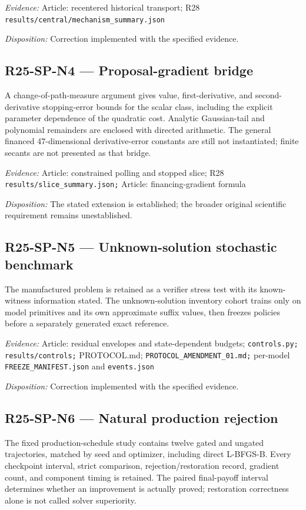 \emph{Evidence:} Article: recentered historical transport; R28 \nolinkurl{results/central/mechanism_summary.json}

\emph{Disposition:} Correction implemented with the specified evidence.
\subsection{R25-SP-N4 --- Proposal-gradient bridge}
A change-of-path-measure argument gives value, first-derivative, and second-derivative stopping-error bounds for the scalar class, including the explicit parameter dependence of the quadratic cost. Analytic Gaussian-tail and polynomial remainders are enclosed with directed arithmetic. The general financed 47-dimensional derivative-error constants are still not instantiated; finite secants are not presented as that bridge.

\emph{Evidence:} Article: constrained polling and stopped slice; R28 \nolinkurl{results/slice_summary.json;} Article: financing-gradient formula

\emph{Disposition:} The stated extension is established; the broader original scientific requirement remains unestablished.
\subsection{R25-SP-N5 --- Unknown-solution stochastic benchmark}
The manufactured problem is retained as a verifier stress test with its known-witness information stated. The unknown-solution inventory cohort trains only on model primitives and its own approximate suffix values, then freezes policies before a separately generated exact reference.

\emph{Evidence:} Article: residual envelopes and state-dependent budgets; \nolinkurl{controls.py;} \nolinkurl{results/controls;} PROTOCOL.md; \nolinkurl{PROTOCOL_AMENDMENT_01.md;} per-model \nolinkurl{FREEZE_MANIFEST.json} and \nolinkurl{events.json}

\emph{Disposition:} Correction implemented with the specified evidence.
\subsection{R25-SP-N6 --- Natural production rejection}
The fixed production-schedule study contains twelve gated and ungated trajectories, matched by seed and optimizer, including direct L-BFGS-B. Every checkpoint interval, strict comparison, rejection/restoration record, gradient count, and component timing is retained. The paired final-payoff interval determines whether an improvement is actually proved; restoration correctness alone is not called solver superiority.

